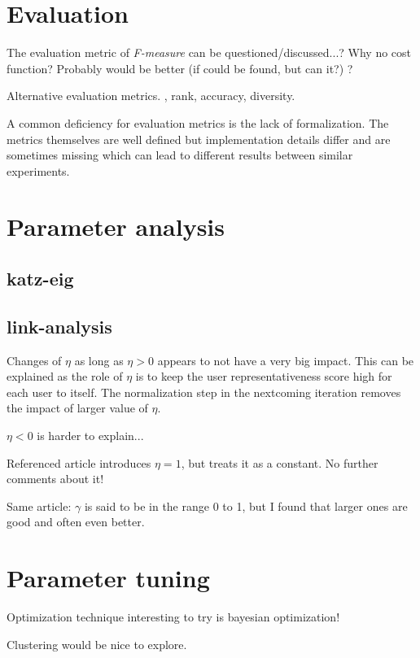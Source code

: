 \section{Evaluation}

The evaluation metric of \textit{F-measure} can be questioned/discussed...? Why no cost function? Probably would be better (if could be found, but can it?) ?

Alternative evaluation metrics. \rmse, rank, accuracy, diversity.

A common deficiency for evaluation metrics is the lack of formalization. The metrics themselves are well defined but implementation details differ and are sometimes missing which can lead to different results between similar experiments.


\section{Parameter analysis}

\subsection{katz-eig}

\subsection{link-analysis}

Changes of $\eta$ as long as $\eta > 0$ appears to not have a very big impact. This can be explained as the role of $\eta$ is to keep the user representativeness score high for each user to itself. The normalization step in the nextcoming iteration removes the impact of larger value of $\eta$.

$\eta < 0 $ is harder to explain...

Referenced article introduces $\eta = 1$, but treats it as a constant. No further comments about it!

Same article: $\gamma$ is said to be in the range 0 to 1, but I found that larger ones are good and often even better.


\section{Parameter tuning}

Optimization technique interesting to try is bayesian optimization!

Clustering would be nice to explore.

